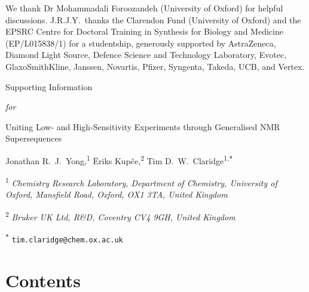 \documentclass[a4paper,12pt]{article}
\newcommand{\articletitle}{\todo{Uniting Low- and High-Sensitivity Experiments through Generalised NMR Supersequences}}
\newcommand{\crl}{Chemistry Research Laboratory, Department of Chemistry, University of Oxford, Mansfield Road, Oxford, OX1 3TA, United Kingdom}
\newcommand{\brukeruk}{Bruker UK Ltd, R\&D, Coventry CV4 9GH, United Kingdom}
\newcommand{\todo}[1]{{\color{OrangeRed}#1}}
\begin{document}
\begin{refsection}
We thank Dr Mohammadali Foroozandeh (University of Oxford) for helpful discussions.
J.R.J.Y.\ thanks the Clarendon Fund (University of Oxford) and the EPSRC Centre for Doctoral Training in Synthesis for Biology and Medicine (EP/L015838/1) for a studentship, generously supported by AstraZeneca, Diamond Light Source, Defence Science and Technology Laboratory, Evotec, GlaxoSmithKline, Janssen, Novartis, Pfizer, Syngenta, Takeda, UCB, and Vertex.

\AtNextBibliography{\small}
\printbibliography{}
\end{refsection}



\clearpage
\begin{refsection}
\newcommand{\sectionbreak}{\clearpage}
\renewcommand*{\thefigure}{S\arabic{figure}}
\renewcommand*{\thesection}{S\arabic{section}}
\renewcommand*{\thetable}{S\arabic{table}}
\renewcommand*{\thepage}{S\arabic{page}}
\setcounter{page}{1}
\setcounter{figure}{0}
\setcounter{section}{0}
\setcounter{table}{0}
\onehalfspacing

\hspace{0pt}
\vfill
\begin{center}
    \huge
    Supporting Information

    \vspace{0.3cm}

    \textit{for}

    \vspace{0.3cm}

    \articletitle{}

    \vspace{0.6cm}

    \Large Jonathan R.\ J.\ Yong,\textsuperscript{1} {\=E}riks Kup{\v{c}}e,\textsuperscript{2} Tim D.\ W.\ Claridge\textsuperscript{1,\texttt{*}}

    \vspace{0.6cm}

    \large \textsuperscript{1} \textit{\crl{}}

    \textsuperscript{2} \textit{\brukeruk{}}

    \textsuperscript{\texttt{*}} \texttt{tim.claridge@chem.ox.ac.uk}

\end{center}

\vspace{2cm}
\section*{Contents}


\end{refsection}
\end{document}
